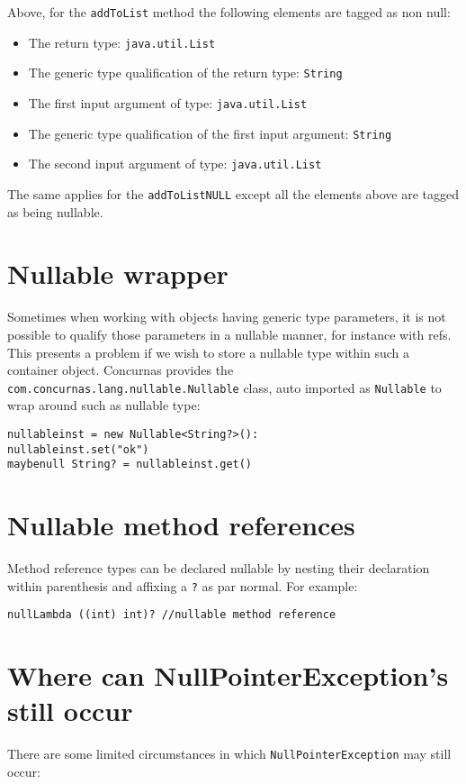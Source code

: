 \documentclass[conc-doc]{subfiles}
\begin{document}
Above, for the \lstinline{addToList} method the following elements are tagged as non null:
\begin{itemize}
	\item The return type: \lstinline{java.util.List}
	\item The generic type qualification of the return type: \lstinline{String}
	\item The first input argument of type: \lstinline{java.util.List}
	\item The generic type qualification of the first input argument: \lstinline{String}
	\item The second input argument of type: \lstinline{java.util.List}
\end{itemize}

The same applies for the \lstinline{addToListNULL} except all the elements above are tagged as being nullable.


\section{Nullable wrapper}
Sometimes when working with objects having generic type parameters, it is not possible to qualify those parameters in a nullable manner, for instance with refs. This presents a problem if we wish to store a nullable type within such a container object. Concurnas provides the \lstinline{com.concurnas.lang.nullable.Nullable} class, auto imported as \lstinline{Nullable} to wrap around such as nullable type:

\begin{lstlisting}
nullableinst = new Nullable<String?>():
nullableinst.set("ok")
maybenull String? = nullableinst.get()
\end{lstlisting}


\section{Nullable method references}
Method reference types can be declared nullable by nesting their declaration within parenthesis and affixing a \lstinline{?} as par normal. For example:

\begin{lstlisting}
nullLambda ((int) int)? //nullable method reference
\end{lstlisting}

\section{Where can NullPointerException's still occur}
There are some limited circumstances in which \lstinline{NullPointerException} may still occur:
\end{document}

